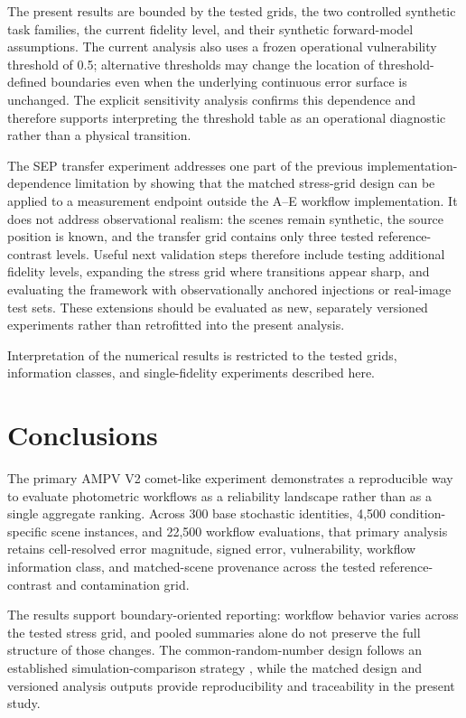 The present results are bounded by the tested grids, the two controlled
synthetic task families, the current fidelity level, and their synthetic
forward-model assumptions. The current analysis also uses a frozen operational vulnerability
threshold of 0.5; alternative thresholds may change the location of
threshold-defined boundaries even when the underlying continuous error
surface is unchanged. The explicit sensitivity analysis confirms this
dependence and therefore supports interpreting the threshold table as an
operational diagnostic rather than a physical transition.

The SEP transfer experiment addresses one part of the previous
implementation-dependence limitation by showing that the matched
stress-grid design can be applied to a measurement endpoint outside the
A--E workflow implementation. It does not address observational realism:
the scenes remain synthetic, the source position is known, and the
transfer grid contains only three tested reference-contrast levels.
Useful next validation steps therefore include testing additional
fidelity levels, expanding the stress grid where transitions appear
sharp, and evaluating the framework with observationally anchored
injections or real-image test sets. \cite{ref6} \cite{ref5} These
extensions should be evaluated as new, separately versioned experiments
rather than retrofitted into the present analysis.

Interpretation of the numerical results is restricted to the tested
grids, information classes, and single-fidelity experiments described
here.

\section{Conclusions}\label{conclusions}

The primary AMPV V2 comet-like experiment demonstrates a
reproducible way to evaluate photometric workflows as a reliability
landscape rather than as a single aggregate ranking. Across 300 base
stochastic identities, 4,500 condition-specific scene instances, and
22,500 workflow evaluations, that primary analysis retains cell-resolved
error magnitude, signed error, vulnerability, workflow information
class, and matched-scene provenance across the tested reference-contrast
and contamination grid.

The results support boundary-oriented reporting: workflow behavior
varies across the tested stress grid, and pooled summaries alone do not
preserve the full structure of those changes. The common-random-number
design follows an established simulation-comparison strategy
\cite{ref7}, while the matched design and versioned analysis outputs provide
reproducibility and traceability in the present study.

